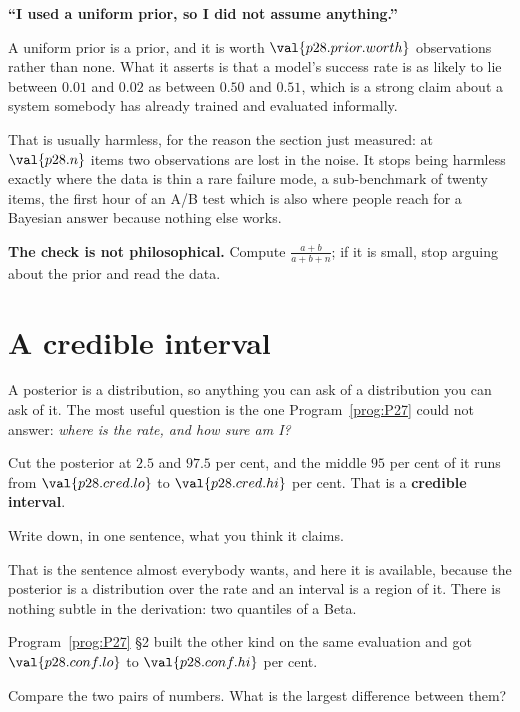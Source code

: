 \begin{fr}
\begin{trapbox}
\textbf{\enquote{I used a uniform prior, so I did not assume anything.}}

A uniform prior is a prior, and it is worth $\val{p28.prior.worth}$
observations rather than none. What it asserts is that a model's success rate
is as likely to lie between $\num{0.01}$ and $\num{0.02}$ as between
$\num{0.50}$ and $\num{0.51}$, which is a strong claim about a system somebody
has already trained and evaluated informally.

That is usually harmless, for the reason the section just measured: at
$\val{p28.n}$ items two observations are lost in the noise. It stops being
harmless exactly where the data is thin \dash{} a rare failure mode, a
sub-benchmark of twenty items, the first hour of an A/B test \dash{} which is
also where people reach for a Bayesian answer because nothing else works.

\textbf{The check is not philosophical.} Compute $\frac{a+b}{a+b+n}$; if it is
small, stop arguing about the prior and read the data.
\end{trapbox}
\end{fr}

\section{A credible interval}
\label{sec:P28-credible}

\begin{fr}
A posterior is a distribution, so anything you can ask of a distribution you
can ask of it. The most useful question is the one
Program~\ref{prog:P27} could not answer: \emph{where is the rate, and how
sure am I?}

Cut the posterior at $\num{2.5}$ and $\num{97.5}$ per cent, and the middle
$95$ per cent of it runs from $\val{p28.cred.lo}$ to $\val{p28.cred.hi}$ per
cent. That is a \textbf{credible interval}.

Write down, in one sentence, what you think it claims.
\dotline
\nextframe
\end{fr}

\begin{fr}

That is the sentence almost everybody wants, and here it is available,
because the posterior is a distribution over the rate and an interval is a
region of it. There is nothing subtle in the derivation: two quantiles of a
Beta.

Program~\ref{prog:P27} §2 built the other kind on the same evaluation and got
$\val{p28.conf.lo}$ to $\val{p28.conf.hi}$ per cent.

Compare the two pairs of numbers. What is the largest difference between
them?
\dotline
\nextframe
\end{fr}


